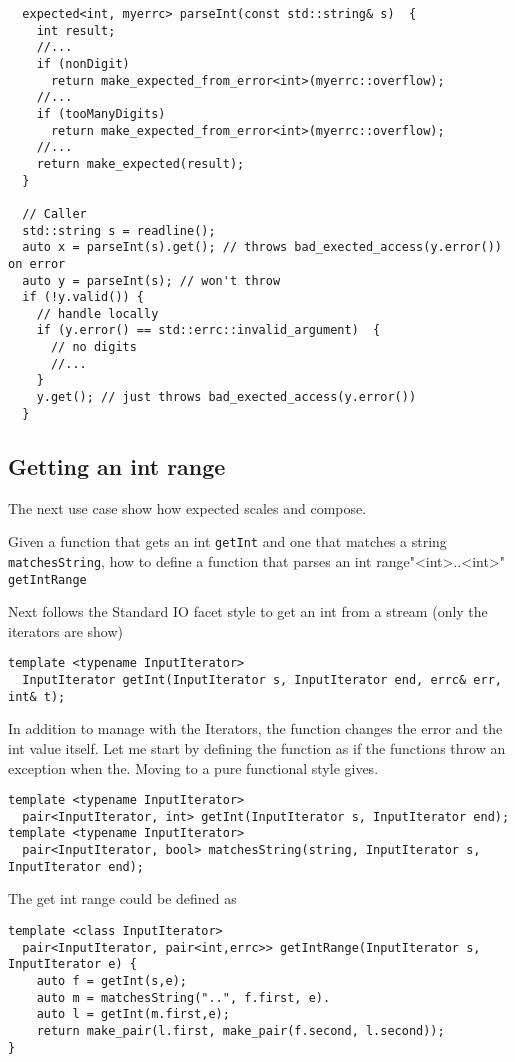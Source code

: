 \documentclass[a4paper,10pt]{article}
\newcommand{\cpp}[1]{\lstinline{#1}}
\begin{document}
\begin{lstlisting}
  expected<int, myerrc> parseInt(const std::string& s)  {
    int result;
    //...
    if (nonDigit)  
      return make_expected_from_error<int>(myerrc::overflow);
    //...
    if (tooManyDigits)  
      return make_expected_from_error<int>(myerrc::overflow);
    //...
    return make_expected(result);
  }

  // Caller
  std::string s = readline();
  auto x = parseInt(s).get(); // throws bad_exected_access(y.error()) on error
  auto y = parseInt(s); // won't throw
  if (!y.valid()) {
    // handle locally
    if (y.error() == std::errc::invalid_argument)  {
      // no digits
      //...
    }
    y.get(); // just throws bad_exected_access(y.error())
  }
\end{lstlisting}

\subsection{Getting an int range}

The next use case show how expected scales and compose. 

Given a function that gets an int \cpp{getInt} and one that matches a string \cpp{matchesString}, how to define a function that parses an int range"<int>..<int>" \cpp{getIntRange}

Next follows the Standard IO facet style to get an int from a stream (only the iterators are show)

\begin{lstlisting}
template <typename InputIterator>
  InputIterator getInt(InputIterator s, InputIterator end, errc& err, int& t);
\end{lstlisting}

In addition to manage with the Iterators, the function changes the error and the int value itself. Let me start by defining the function as if the functions throw an exception when the. Moving to a pure functional style gives.

\begin{lstlisting}
template <typename InputIterator>
  pair<InputIterator, int> getInt(InputIterator s, InputIterator end);
template <typename InputIterator>
  pair<InputIterator, bool> matchesString(string, InputIterator s, InputIterator end);
\end{lstlisting}

The get int range could be defined as

\begin{lstlisting}
template <class InputIterator>
  pair<InputIterator, pair<int,errc>> getIntRange(InputIterator s, InputIterator e) {
    auto f = getInt(s,e);
    auto m = matchesString("..", f.first, e).
    auto l = getInt(m.first,e);       
    return make_pair(l.first, make_pair(f.second, l.second));
}
\end{lstlisting}
\end{document}
